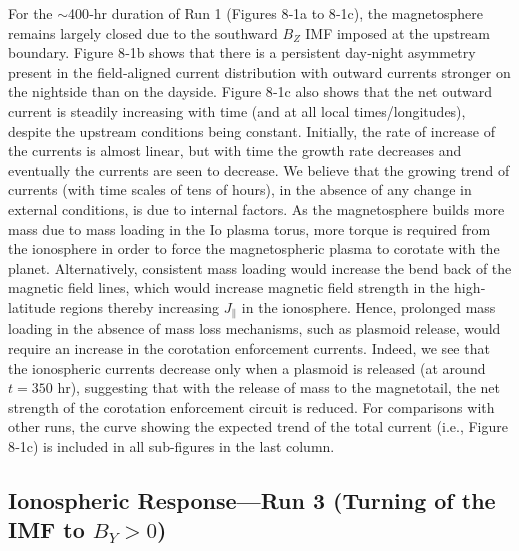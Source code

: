 For the $\sim$400‐hr duration of Run 1 (Figures 8‐1a to 8‐1c), the magnetosphere remains largely closed due to the southward $B_Z$ IMF imposed at the upstream boundary. Figure 8‐1b shows that there is a persistent day‐night asymmetry present in the field‐aligned current distribution with outward currents stronger on the nightside than on the dayside. Figure 8‐1c also shows that the net outward current is steadily increasing with time (and at all local times/longitudes), despite the upstream conditions being constant. Initially, the rate of increase of the currents is almost linear, but with time the growth rate decreases and eventually the currents are seen to decrease. We believe that the growing trend of currents (with time scales of tens of hours), in the absence of any change in external conditions, is due to internal factors. As the magnetosphere builds more mass due to mass loading in the Io plasma torus, more torque is required from the ionosphere in order to force the magnetospheric plasma to corotate with the planet. Alternatively, consistent mass loading would increase the bend back of the magnetic field lines, which would increase magnetic field strength in the high‐latitude regions thereby increasing $J_\parallel$ in the ionosphere. Hence, prolonged mass loading in the absence of mass loss mechanisms, such as plasmoid release, would require an increase in the corotation enforcement currents. Indeed, we see that the ionospheric currents decrease only when a plasmoid is released (at around $t = 350$ hr), suggesting that with the release of mass to the magnetotail, the net strength of the corotation enforcement circuit is reduced. For comparisons with other runs, the curve showing the expected trend of the total current (i.e., Figure 8‐1c) is included in all sub-figures in the last column. 

\subsection{Ionospheric Response—Run 3 (Turning of the IMF to \texorpdfstring{$B_Y > 0$}{By>0}) }


